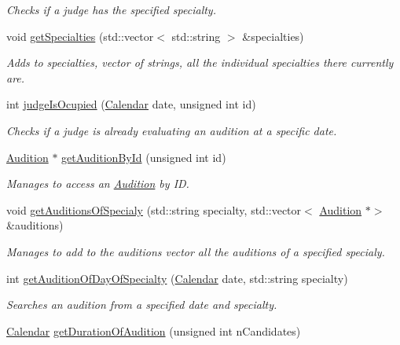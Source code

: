 \begin{DoxyCompactItemize}
\begin{DoxyCompactList}\small\item\em Checks if a judge has the specified specialty. \end{DoxyCompactList}\item 
void \hyperlink{class_company_aab93a983bbd590e540b439033c9ec723}{get\+Specialties} (std\+::vector$<$ std\+::string $>$ \&specialties)
\begin{DoxyCompactList}\small\item\em Adds to specialties, vector of strings, all the individual specialties there currently are. \end{DoxyCompactList}\item 
int \hyperlink{class_company_a65a8b53db0f81846a91709108f4e36fa}{judge\+Is\+Ocupied} (\hyperlink{class_calendar}{Calendar} date, unsigned int id)
\begin{DoxyCompactList}\small\item\em Checks if a judge is already evaluating an audition at a specific date. \end{DoxyCompactList}\item 
\hyperlink{class_audition}{Audition} $\ast$ \hyperlink{class_company_ab55bf93a7417322bfd8ef7fc7596e609}{get\+Audition\+By\+Id} (unsigned int id)
\begin{DoxyCompactList}\small\item\em Manages to access an \hyperlink{class_audition}{Audition} by ID. \end{DoxyCompactList}\item 
void \hyperlink{class_company_a9740e4c34fac69951145e289269fabdb}{get\+Auditions\+Of\+Specialy} (std\+::string specialty, std\+::vector$<$ \hyperlink{class_audition}{Audition} $\ast$$>$ \&auditions)
\begin{DoxyCompactList}\small\item\em Manages to add to the auditions vector all the auditions of a specified specialy. \end{DoxyCompactList}\item 
int \hyperlink{class_company_ad0f12e0fa92a28869aac46fde4b304c8}{get\+Audition\+Of\+Day\+Of\+Specialty} (\hyperlink{class_calendar}{Calendar} date, std\+::string specialty)
\begin{DoxyCompactList}\small\item\em Searches an audition from a specified date and specialty. \end{DoxyCompactList}\item 
\hyperlink{class_calendar}{Calendar} \hyperlink{class_company_ac51c38ee442d1b87f0eede53e2919c3a}{get\+Duration\+Of\+Audition} (unsigned int n\+Candidates)
$$
\end{DoxyCompactItemize}

